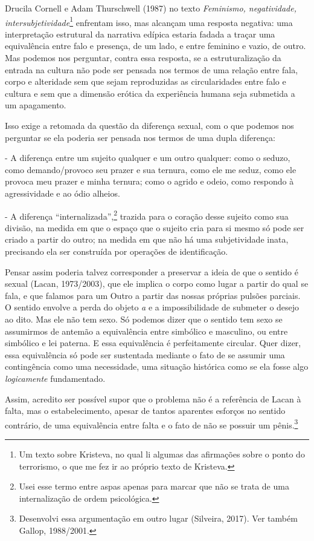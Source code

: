 Drucila Cornell e Adam Thurschwell (1987) no texto \emph{Feminismo,
negatividade, intersubjetividade}\footnote{Um texto sobre Kristeva, no
  qual li algumas das afirmações sobre o ponto do terrorismo, o que me
  fez ir ao próprio texto de Kristeva.} enfrentam isso, mas alcançam uma
resposta negativa: uma interpretação estrutural da narrativa edípica
estaria fadada a traçar uma equivalência entre falo e presença, de um
lado, e entre feminino e vazio, de outro. Mas podemos nos perguntar,
contra essa resposta, se a estruturalização da entrada na cultura não
pode ser pensada nos termos de uma relação entre fala, corpo e
alteridade sem que sejam reproduzidas as circularidades entre falo e
cultura e sem que a dimensão erótica da experiência humana seja
submetida a um apagamento.

Isso exige a retomada da questão da diferença sexual, com o que podemos
nos perguntar se ela poderia ser pensada nos termos de uma dupla
diferença:

- A diferença entre um sujeito qualquer e um outro qualquer: como o
seduzo, como demando/provoco seu prazer e sua ternura, como ele me
seduz, como ele provoca meu prazer e minha ternura; como o agrido e
odeio, como respondo à agressividade e ao ódio alheios.

- A diferença ``internalizada'',\footnote{Usei esse termo entre aspas
  apenas para marcar que não se trata de uma internalização de ordem
  psicológica.} trazida para o coração desse sujeito como sua divisão,
na medida em que o espaço que o sujeito cria para si mesmo só pode ser
criado a partir do outro; na medida em que não há uma subjetividade
inata, precisando ela ser construída por operações de identificação.

Pensar assim poderia talvez corresponder a preservar a ideia de que o
sentido é sexual (Lacan, 1973/2003), que ele implica o corpo como lugar
a partir do qual se fala, e que falamos para um Outro a partir das
nossas próprias pulsões parciais. O sentido envolve a perda do objeto
\emph{a} e a impossibilidade de submeter o desejo ao dito. Mas ele não
tem sexo. Só podemos dizer que o sentido tem sexo se assumirmos de
antemão a equivalência entre simbólico e masculino, ou entre simbólico e
lei paterna. E essa equivalência é perfeitamente circular. Quer dizer,
essa equivalência só pode ser sustentada mediante o fato de se assumir
uma contingência como uma necessidade, uma situação histórica como se
ela fosse algo \emph{logicamente} fundamentado.

Assim, acredito ser possível supor que o problema não é a referência de
Lacan à falta, mas o estabelecimento, apesar de tantos aparentes
esforços no sentido contrário, de uma equivalência entre falta e o fato
de não se possuir um pênis.\footnote{Desenvolvi essa argumentação em
  outro lugar (Silveira, 2017). Ver também Gallop, 1988/2001.}

